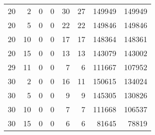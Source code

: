 \begin{tabular}{rrrrrrrr}
20 &  2 &               0 &          0 &          30 &         27 &       149949 &     149949 \\
20 &  5 &               0 &          0 &          22 &         22 &       149846 &     149846 \\
20 & 10 &               0 &          0 &          17 &         17 &       148364 &     148361 \\
20 & 15 &               0 &          0 &          13 &         13 &       143079 &     143002 \\
29 & 11 &               0 &          0 &           7 &          6 &       111667 &     107952 \\
30 &  2 &               0 &          0 &          16 &         11 &       150615 &     134024 \\
30 &  5 &               0 &          0 &           9 &          9 &       145305 &     130826 \\
30 & 10 &               0 &          0 &           7 &          7 &       111668 &     106537 \\
30 & 15 &               0 &          0 &           6 &          6 &        81645 &      78819 \\
\bottomrule
\end{tabular}
